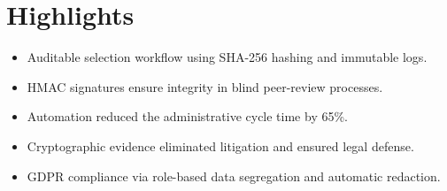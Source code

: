 \documentclass[12pt]{article}
\begin{document}
\section*{Highlights}
\begin{itemize}
    \item Auditable selection workflow using SHA-256 hashing and immutable logs.
    \item HMAC signatures ensure integrity in blind peer-review processes.
    \item Automation reduced the administrative cycle time by 65\%.
    \item Cryptographic evidence eliminated litigation and ensured legal defense.
    \item GDPR compliance via role-based data segregation and automatic redaction.
\end{itemize}
\end{document}
